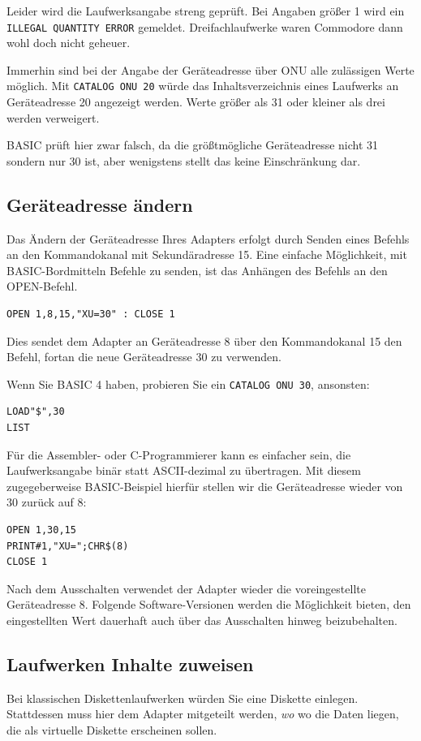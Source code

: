 \documentclass[10pt,a4paper]{scrartcl}		%
\begin{document}
Leider wird die Laufwerksangabe streng geprüft. Bei Angaben größer 1
wird ein \texttt{ILLEGAL QUANTITY ERROR} gemeldet. Dreifachlaufwerke
waren Commodore dann wohl doch nicht geheuer.

Immerhin sind bei der Angabe der Geräteadresse über ONU alle
zulässigen Werte möglich. Mit \texttt{CATALOG ONU 20} würde das
Inhaltsverzeichnis eines Laufwerks an Geräteadresse 20 angezeigt werden.
Werte größer als 31 oder kleiner als drei werden verweigert. 

BASIC prüft hier zwar falsch, da die größtmögliche Geräteadresse nicht 31
sondern nur 30 ist, aber wenigstens stellt das keine Einschränkung dar.

\subsection{Geräteadresse ändern}
Das Ändern der Geräteadresse Ihres Adapters erfolgt durch Senden
eines Befehls an den Kommandokanal mit Sekundäradresse 15. Eine einfache
Möglichkeit, mit BASIC-Bordmitteln Befehle zu senden, ist das Anhängen
des Befehls an den OPEN-Befehl.

\begin{verbatim}
OPEN 1,8,15,"XU=30" : CLOSE 1
\end{verbatim}

Dies sendet dem Adapter an Geräteadresse 8 über den Kommandokanal 15
den Befehl, fortan die neue Geräteadresse 30 zu verwenden.

Wenn Sie BASIC 4 haben, probieren Sie ein \texttt{CATALOG ONU 30}, ansonsten:
\begin{verbatim}
LOAD"$",30
LIST
\end{verbatim}

Für die Assembler- oder C-Programmierer kann es einfacher sein,
die Laufwerksangabe binär statt ASCII-dezimal zu übertragen. Mit diesem
zugegeberweise BASIC-Beispiel hierfür stellen wir die Geräteadresse
wieder von 30 zurück auf 8:

\begin{verbatim}
OPEN 1,30,15
PRINT#1,"XU=";CHR$(8)
CLOSE 1
\end{verbatim}

Nach dem Ausschalten verwendet der Adapter wieder die voreingestellte
Geräteadresse 8. Folgende Software-Versionen werden die Möglichkeit 
bieten, den eingestellten Wert dauerhaft auch über das Ausschalten hinweg
beizubehalten.

\clearpage %
\subsection{Laufwerken Inhalte zuweisen}
Bei klassischen Diskettenlaufwerken würden Sie eine Diskette 
einlegen. Stattdessen muss hier dem Adapter mitgeteilt werden, 
\textit{wo} wo die Daten liegen, die als virtuelle Diskette 
erscheinen sollen.
\end{document}
